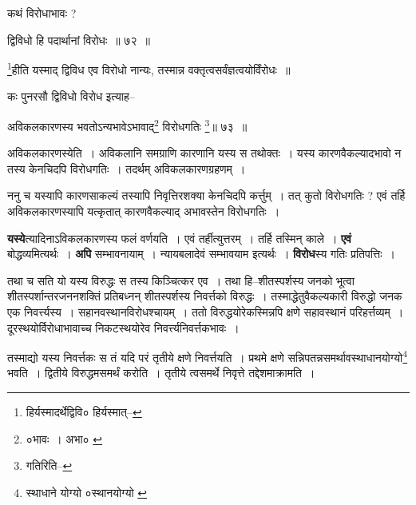 \documentclass[article,12pt,a4paper]{memoir}
\begin{document}
	  \pstart कथं विरोधाभावः ?
	\pend
       
	  \bigskip
	  \begingroup
	

	  \pstart द्विविधो हि पदार्थानां विरोधः ॥ ७२ ॥
	\pend
      
	  \endgroup
	 

	  \pstart \footnote{हिर्यस्मादर्थेद्विवि० \cite{dp-msD} हिर्यस्मात्--\cite{dp-msB}}\-हीति यस्माद् द्विविध एव विरोधो नान्यः, तस्मान्न वक्तृत्वसर्वंज्ञत्वयोर्विंरोधः ॥
	\pend
       

	  \pstart कः पुनरसौ द्विविधो विरोध इत्याह--
	\pend
       
	  \bigskip
	  \begingroup
	

	  \pstart अविकलकारणस्य भवतोऽन्यभावेऽभावाद्\footnote{०भावः । अभा० \cite{dp-msB} \cite{dp-edP} \cite{dp-edH}} विरोधगतिः \footnote{गतिरिति--\cite{dp-msC}}\-॥ ७३ ॥
	\pend
      
	  \endgroup
	 

	  \pstart अविकलकारणस्येति । अविकलानि समग्राणि कारणानि यस्य स तथोक्तः । यस्य कारणवैकल्यादभावो न तस्य केनचिदपि विरोधगतिः । तदर्थम् अविकलकारणग्रहणम् ।
	\pend
       

	  \pstart ननु च यस्यापि कारणसाकल्यं तस्यापि निवृत्तिरशक्या केनचिदपि कर्त्तुम् । तत् कुतो विरोधगतिः ? एवं तर्हि अविकलकारणस्यापि यत्कृतात् कारणवैकल्याद् अभावस्तेन विरोधगतिः ।
	\pend
      
	  \endgroup
	

	  \pstart \textbf{यस्ये}त्यादिनाऽविकलकारणस्य फलं वर्णयति । एवं तर्हीत्युत्तरम् । तर्हि तस्मिन् काले । \textbf{एवं} बोद्धव्यमित्यर्थः । \textbf{अपि} सम्भावनायाम् । न्यायबलादेवं सम्भावयाम इत्यर्थः । \textbf{विरोध}स्य गतिः प्रतिपत्तिः ।
	\pend
	  \bigskip
	  \begingroup
	

	  \pstart तथा च सति यो यस्य विरुद्धः स तस्य किञ्चित्कर एव । तथा हि--शीतस्पर्शस्य जनको भूत्वा शीतस्पर्शान्तरजननशक्तिं प्रतिबध्नन् शीतस्पर्शस्य निवर्त्तको विरुद्धः । तस्माद्धेतुवैकल्यकारी विरुद्धो जनक एक निवर्त्त्यस्य । सहानवस्थानविरोधश्चायम् । ततो विरुद्धयोरेकस्मिन्नपि क्षणे सहावस्थानं परिहर्त्तव्यम् । दूरस्थयोर्विरोधाभावाच्च निकटस्थयोरेव निवर्त्त्यनिवर्त्तकभावः ।
	\pend
       

	  \pstart तस्माद्यो यस्य निवर्त्तकः स तं यदि परं तृतीये क्षणे निवर्त्तयति । प्रथमे क्षणे सन्निपतन्नसमर्थावस्थाधानयोग्यो\footnote{स्थाधाने योग्यो \cite{dp-msD} ०स्थानयोग्यो \cite{dp-msA} \cite{dp-msB} \cite{dp-edP} \cite{dp-edH} \cite{dp-edE}} भवति । द्वितीये विरुद्धमसमर्थं करोति । तृतीये त्वसमर्थे निवृत्ते तद्देशमाक्रामति ।
	\pend
       
\end{document}
